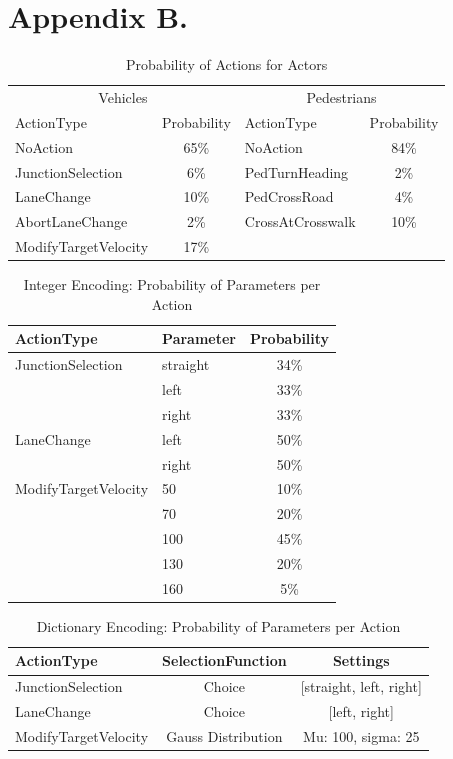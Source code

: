 \chapter{Appendix B.}
\begin{table}[ht]
	\centering
	\begin{tabular}{lc|lc}
		\hline
		\multicolumn{2}{c|}{Vehicles} & \multicolumn{2}{c}{Pedestrians} \\
		ActionType & Probability & ActionType & Probability \\
		\hline
		NoAction & 65\% & NoAction & 84\% \\
		JunctionSelection & 6\% & PedTurnHeading & 2\% \\
		LaneChange & 10\% & PedCrossRoad & 4\% \\
		AbortLaneChange & 2\% & CrossAtCrosswalk & 10\% \\
		ModifyTargetVelocity & 17\% & & \\
		\hline
	\end{tabular}
	\caption{Probability of Actions for Actors}
	\label{table:appendix:action_probabilities}
\end{table}


\begin{table}[ht]
	\centering
	\begin{tabular}{llc}
		\hline
		ActionType & Parameter & Probability \\
		\hline
		JunctionSelection 	& straight & 34\% \\
		& left & 33\% \\
		& right & 33\% \\
		\hline
		LaneChange 			& left & 50\% \\
		& right & 50\% \\
		\hline
		ModifyTargetVelocity & 50 & 10\%\\
		& 70 & 20\%\\
		& 100 & 45\%\\
		& 130 & 20\%\\
		& 160 & 5\%\\
		\hline
	\end{tabular}
	\caption{Integer Encoding: Probability of Parameters per Action}
	\label{table:appendix:integer_encoding_probabilities}
\end{table}


\begin{table}[ht]
	\centering
	\begin{tabular}{lcc}
		\hline
		ActionType & SelectionFunction & Settings \\
		\hline
		JunctionSelection 	& Choice & [straight, left, right] \\
		LaneChange 			& Choice & [left, right]\\
		ModifyTargetVelocity & Gauss Distribution & Mu: 100, sigma: 25\\
		\hline
	\end{tabular}
	\caption{Dictionary Encoding: Probability of Parameters per Action}
	\label{table:appendix:dict_encoding_probabilities}
\end{table}


